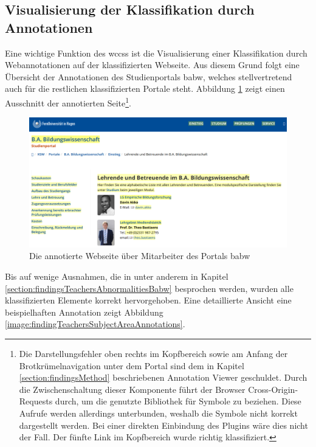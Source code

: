\subsection{Visualisierung der Klassifikation durch Annotationen}
    Eine wichtige Funktion des \glspl{wccs}
    ist die Visualisierung einer Klassifikation durch Webannotationen
    auf der klassifizierten Webseite.
    Aus diesem Grund folgt eine Übersicht der Annotationen
    des Studienportals \gls{babw},
    welches stellvertretend auch für die restlichen klassifizierten Portale steht.
    Abbildung \ref{image:findingTeachersAnnotationsOverview}
    zeigt einen Ausschnitt der annotierten
    Seite\footnote{Die Darstellungsfehler oben rechts im Kopfbereich
    sowie am Anfang der Brotkrümelnavigation unter dem Portal
    sind dem in Kapitel \ref{section:findingsMethod} beschriebenen
    Annotation Viewer geschuldet.
    Durch die Zwischenschaltung dieser Komponente
    führt der Browser Cross-Origin-Requests durch,
    um die genutzte Bibliothek für Symbole zu beziehen.
    Diese Aufrufe werden allerdings unterbunden,
    weshalb die Symbole nicht korrekt dargestellt werden.
    Bei einer direkten Einbindung des Plugins wäre dies nicht der Fall.
    Der fünfte Link im Kopfbereich wurde richtig klassifiziert.}.

    \begin{figure}[htb]
        \centering
        \includegraphics[width=\textwidth]{../resources/findings/case-study-1/babw/annotations/overview.png}
        \caption{Die annotierte Webseite über Mitarbeiter des Portals \acrshort{babw}}
        \label{image:findingTeachersAnnotationsOverview}
    \end{figure}

    Bis auf wenige Ausnahmen, die in unter anderem in
    Kapitel \ref{section:findingsTeachersAbnormalitiesBabw} besprochen werden,
    wurden alle klassifizierten Elemente korrekt hervorgehoben.
    Eine detaillierte Ansicht eine beispielhaften Annotation zeigt
    Abbildung \ref{image:findingTeachersSubjectAreaAnnotations}.

